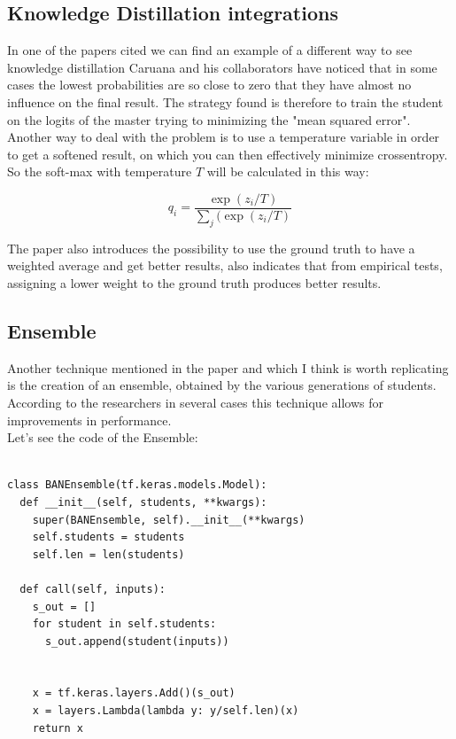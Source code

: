 \subsection{Knowledge Distillation integrations}
In one of the papers cited we can find an example of a different way to see knowledge distillation\cite{kd} Caruana and his collaborators have noticed that in some cases the lowest probabilities are so close to zero that they have almost no influence on the final result\cite{conf}. The strategy found is therefore to train the student on the logits of the master trying to minimizing the "mean squared error".\\
Another way to deal with the problem is to use a temperature variable in order to get a softened result, on which you can then effectively minimize crossentropy. So the soft-max with temperature $T$ will be calculated in this way:

\begin{equation}
q_i = \frac{\exp(z_i/T)}{\sum_j(\exp(z_i/T)}
\end{equation}

The paper\cite{kd} also introduces the possibility to use the ground truth to have a weighted average and get better results, also indicates that from empirical tests, assigning a lower weight to the ground truth produces better results.
\subsection{Ensemble}
Another technique mentioned in the paper\cite{ban} and which I think is worth replicating is the creation of an ensemble, obtained by the various generations of students. According to the researchers in several cases this technique allows for improvements in performance.\\
Let's see the code of the Ensemble:
\lstset{language=Python}
\lstset{frame=lines}
\lstset{basicstyle=\footnotesize}
\begin{lstlisting}

class BANEnsemble(tf.keras.models.Model):
  def __init__(self, students, **kwargs):
    super(BANEnsemble, self).__init__(**kwargs)
    self.students = students
    self.len = len(students)
  
  def call(self, inputs):
    s_out = []
    for student in self.students:
      s_out.append(student(inputs))
      
    
    x = tf.keras.layers.Add()(s_out)
    x = layers.Lambda(lambda y: y/self.len)(x)
    return x

\end{lstlisting}

